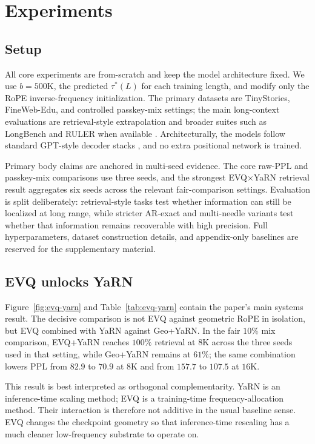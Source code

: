 \section{Experiments}

\subsection{Setup}

All core experiments are from-scratch and keep the model architecture fixed. We use \(b=500\mathrm{K}\), the predicted \(\tau^*(L)\) for each training length, and modify only the RoPE inverse-frequency initialization. The primary datasets are TinyStories, FineWeb-Edu, and controlled passkey-mix settings; the main long-context evaluations are retrieval-style extrapolation and broader suites such as LongBench and RULER when available \citep{bai2024longbench, hsieh2024ruler}. Architecturally, the models follow standard GPT-style decoder stacks \citep{radford2019gpt2}, and no extra positional network is trained.

Primary body claims are anchored in multi-seed evidence. The core raw-PPL and passkey-mix comparisons use three seeds, and the strongest EVQ\(\times\)YaRN retrieval result aggregates six seeds across the relevant fair-comparison settings. Evaluation is split deliberately: retrieval-style tasks test whether information can still be localized at long range, while stricter AR-exact and multi-needle variants test whether that information remains recoverable with high precision. Full hyperparameters, dataset construction details, and appendix-only baselines are reserved for the supplementary material.

\subsection{EVQ unlocks YaRN}

Figure~\ref{fig:evq-yarn} and Table~\ref{tab:evq-yarn} contain the paper's main systems result. The decisive comparison is not EVQ against geometric RoPE in isolation, but EVQ combined with YaRN against Geo+YaRN. In the fair \(10\%\) mix comparison, EVQ+YaRN reaches \(100\%\) retrieval at \(8\mathrm{K}\) across the three seeds used in that setting, while Geo+YaRN remains at \(61\%\); the same combination lowers PPL from \(82.9\) to \(70.9\) at \(8\mathrm{K}\) and from \(157.7\) to \(107.5\) at \(16\mathrm{K}\).

This result is best interpreted as orthogonal complementarity. YaRN is an inference-time scaling method; EVQ is a training-time frequency-allocation method. Their interaction is therefore not additive in the usual baseline sense. EVQ changes the checkpoint geometry so that inference-time rescaling has a much cleaner low-frequency substrate to operate on.

